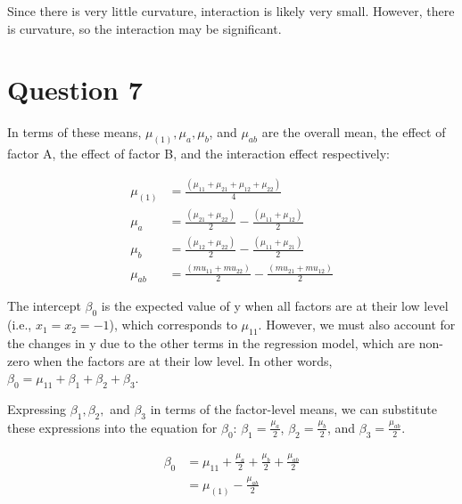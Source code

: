 \documentclass{article}
\begin{document}
Since there is very little curvature, interaction is likely very small. However, there is curvature, so the interaction may be significant.

\section*{Question 7}
\begin{flushleft}
In terms of these means, $\mu_{(1)}, \mu_a, \mu_b$, and $\mu_{ab}$ are the overall mean,
the effect of factor A, the effect of factor B, and the interaction effect respectively:\\
\end{flushleft}
\begin{align*}
    \mu_{(1)} &= \frac{(\mu_{11} + \mu_{21} + \mu_{12} + \mu_{22})}{4}\\
    \mu_a &= \frac{(\mu_{21} + \mu_{22})}{2} - \frac{(\mu_{11} + \mu_{12})}{2}\\
    \mu_b &= \frac{(\mu_{12} + \mu_{22})}{2}- \frac{(\mu_{11} + \mu_{21})}{2}\\
    \mu_{ab} &= \frac{(mu_{11} + mu_{22})}{2} - \frac{(mu_{21} + mu_{12})}{2}
\end{align*}
\begin{flushleft}
The intercept $\beta_0$ is the expected value of y when all factors are at their low level
(i.e., $x_1 = x_2 = -1$), which corresponds to $\mu_{11}$.
However, we must also account for the changes in y due to the other terms
in the regression model, which are non-zero when the factors are at their low level.
In other words, $\beta_0 = \mu_{11} + \beta_1 + \beta_2 + \beta_3$. \\
\end{flushleft}
\begin{flushleft}
Expressing $\beta_1, \beta_2,$ and $\beta_3$ in terms of the factor-level means, we can substitute these expressions into the equation for $\beta_0$:
$\beta_1 = \frac{\mu_a}{2}$, 
$\beta_2 = \frac{\mu_b}{2}$, and 
$\beta_3 = \frac{\mu_{ab}}{2}$.
\end{flushleft}
\begin{align*}
    \beta_0 &= \mu_{11} + \frac{\mu_a}{2} + \frac{\mu_b}{2} + \frac{\mu_{ab}}{2}\\
            &= \mu_{(1)} - \frac{\mu_{ab}}{2}
\end{align*}
\end{document}
